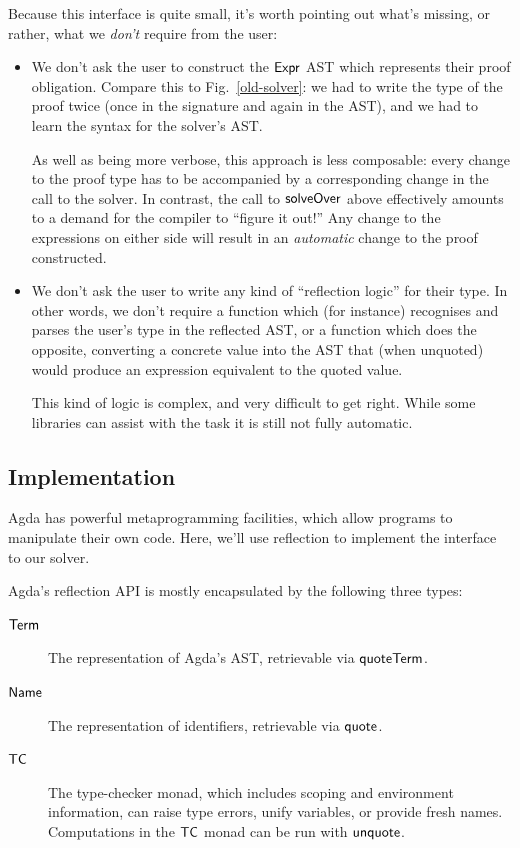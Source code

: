 \documentclass[acmsmall,review,anonymous]{acmart}\settopmatter{printfolios=true,printccs=false,printacmref=false}
\theoremstyle{remark}
\begin{document}
Because this interface is quite small, it's worth pointing out what's missing,
or rather, what we \emph{don't} require from the user:

\begin{itemize}
  \item We don't ask the user to construct the \(\AgdaDatatype{Expr}\) AST which
    represents their proof obligation. Compare this to Fig.~\ref{old-solver}: we
    had to write the type of the proof twice (once in the signature and again in
    the AST), and we had to learn the syntax for the solver's AST. 

    As well as being more verbose, this approach is less composable: every
    change to the proof type has to be accompanied by a corresponding change in
    the call to the solver. In contrast, the call to \(\AgdaMacro{solveOver}\)
    above effectively amounts to a demand for the compiler to ``figure it out!''
    Any change to the expressions on either side will result in an
    \emph{automatic} change to the proof constructed.
  \item We don't ask the user to write any kind of ``reflection logic'' for
    their type. In other words, we don't require a function which (for instance)
    recognises and parses the user's type in the reflected AST, or a function
    which does the opposite, converting a concrete value into the AST that (when
    unquoted) would produce an expression equivalent to the quoted value.

    This kind of logic is complex, and very difficult to get right. While some
    libraries can assist with the task \citep{hinze_engineering_2013,
      norell_agda-prelude_2018} it is still not fully automatic.
\end{itemize}
\subsection{Implementation} \label{reflection}
Agda has powerful metaprogramming facilities, which allow programs to manipulate
their own code. Here, we'll use reflection to implement the interface to our
solver.

Agda's reflection API is mostly encapsulated by the following three types:
\begin{description}
  \item[\(\AgdaDatatype{Term}\)] The representation of Agda's AST, retrievable
    via \(\AgdaKeyword{quoteTerm}\).
  \item[\(\AgdaDatatype{Name}\)] The representation of identifiers, retrievable
    via \(\AgdaKeyword{quote}\).
  \item[\(\AgdaDatatype{TC}\)] The type-checker monad, which includes scoping
    and environment information, can raise type errors, unify variables, or
    provide fresh names. Computations in the \(\AgdaDatatype{TC}\) monad can be
    run with \(\AgdaKeyword{unquote}\).
\end{description}
\end{document}

